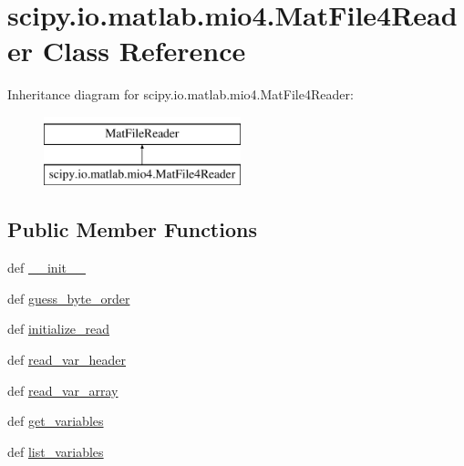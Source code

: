 \hypertarget{classscipy_1_1io_1_1matlab_1_1mio4_1_1MatFile4Reader}{}\section{scipy.\+io.\+matlab.\+mio4.\+Mat\+File4\+Reader Class Reference}
\label{classscipy_1_1io_1_1matlab_1_1mio4_1_1MatFile4Reader}
Inheritance diagram for scipy.\+io.\+matlab.\+mio4.\+Mat\+File4\+Reader\+:\begin{figure}[H]
\begin{center}
\leavevmode
\includegraphics[height=2.000000cm]{classscipy_1_1io_1_1matlab_1_1mio4_1_1MatFile4Reader}
\end{center}
\end{figure}
\subsection*{Public Member Functions}
\begin{DoxyCompactItemize}
\item 
def \hyperlink{classscipy_1_1io_1_1matlab_1_1mio4_1_1MatFile4Reader_aad58100c4df72ab129c29d4c19db8503}{\+\_\+\+\_\+init\+\_\+\+\_\+}
\item 
def \hyperlink{classscipy_1_1io_1_1matlab_1_1mio4_1_1MatFile4Reader_a405e6706cbf25ba05c869b2cd6eaaba8}{guess\+\_\+byte\+\_\+order}
\item 
def \hyperlink{classscipy_1_1io_1_1matlab_1_1mio4_1_1MatFile4Reader_a54a3e45db3d32d150d3b6e2ae0e918c1}{initialize\+\_\+read}
\item 
def \hyperlink{classscipy_1_1io_1_1matlab_1_1mio4_1_1MatFile4Reader_a861ea7fda35306a243ed3595f672edc5}{read\+\_\+var\+\_\+header}
\item 
def \hyperlink{classscipy_1_1io_1_1matlab_1_1mio4_1_1MatFile4Reader_afe63942818f977639497355079cc63ed}{read\+\_\+var\+\_\+array}
\item 
def \hyperlink{classscipy_1_1io_1_1matlab_1_1mio4_1_1MatFile4Reader_add5c055659f90c819605de3d4ac9c0da}{get\+\_\+variables}
\item 
def \hyperlink{classscipy_1_1io_1_1matlab_1_1mio4_1_1MatFile4Reader_ae51fce013065240b84455af7b0c8e820}{list\+\_\+variables}
\end{DoxyCompactItemize}
